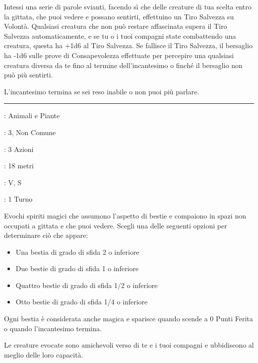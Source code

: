 \begin{multicols}{2}
Intessi una serie di parole svianti, facendo sì che delle creature di tua scelta entro la gittata, che puoi vedere e possano sentirti, effettuino un Tiro Salvezza su Volontà. Qualsiasi creatura che non può restare affascinata supera il Tiro Salvezza automaticamente, e se tu o i tuoi compagni state combattendo una creatura, questa ha +1d6 al Tiro Salvezza. Se fallisce il Tiro Salvezza, il bersaglio ha -1d6 sulle prove di Consapevolezza effettuate per percepire una qualsiasi creatura diversa da te fino al termine dell'incantesimo o finché il bersaglio non può più sentirti.

L'incantesimo termina se sei reso inabile o non puoi più parlare.

\smallskip\noindent\rule{\linewidth}{2pt} \hypertarget{Evoca Animali}{}\medskip{}
\noindent
\begin{description}[noitemsep, topsep=0pt, parsep=0pt, partopsep=0pt, leftmargin=0cm, labelwidth=2.8cm]
	\item[\textbf{Lista di Magia}]: Animali e Piante
	\item[\textbf{Livello}]: 3, Non Comune
	\item[\textbf{T. di Lancio}]: 3 Azioni
	\item[\textbf{Gittata}]: 18 metri
	\item[\textbf{Componenti}]: V, S
	\item[\textbf{Durata}]: 1 Turno
\end{description}

Evochi spiriti magici che assumono l'aspetto di bestie e compaiono in spazi non occupati a gittata e che puoi vedere. Scegli una delle seguenti opzioni per determinare ciò che appare:

\begin{itemize}[leftmargin=*] \setlength{\itemsep}{-1pt}
	\item Una bestia di grado di sfida 2 o inferiore
	\item Due bestie di grado di sfida 1 o inferiore
	\item Quattro bestie di grado di sfida 1/2 o inferiore
	\item Otto bestie di grado di sfida 1/4 o inferiore
\end{itemize}

Ogni bestia è considerata anche magica e sparisce quando scende a 0 Punti Ferita o quando l'incantesimo termina.

Le creature evocate sono amichevoli verso di te e i tuoi compagni e ubbidiscono al meglio delle loro capacità.


\end{multicols}
